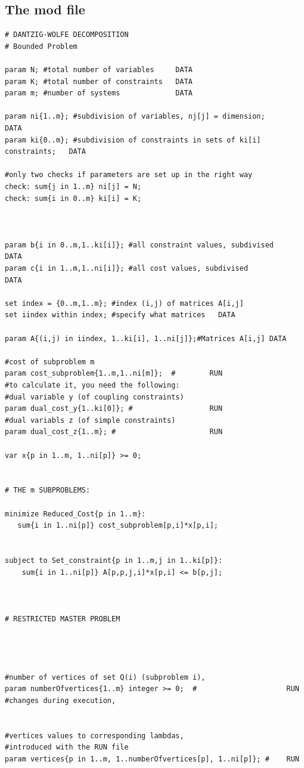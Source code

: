 \documentclass[a4paper,12pt]{article}
\begin{document}
\subsection{The mod file}
\begin{lstlisting}
# DANTZIG-WOLFE DECOMPOSITION
# Bounded Problem

param N; #total number of variables     DATA
param K; #total number of constraints   DATA
param m; #number of systems             DATA 

param ni{1..m}; #subdivision of variables, nj[j] = dimension;               DATA
param ki{0..m}; #subdivision of constraints in sets of ki[i] constraints;   DATA

#only two checks if parameters are set up in the right way
check: sum{j in 1..m} ni[j] = N;
check: sum{i in 0..m} ki[i] = K; 



param b{i in 0..m,1..ki[i]}; #all constraint values, subdivised          DATA
param c{i in 1..m,1..ni[i]}; #all cost values, subdivised                DATA

set index = {0..m,1..m}; #index (i,j) of matrices A[i,j] 
set iindex within index; #specify what matrices   DATA

param A{(i,j) in iindex, 1..ki[i], 1..ni[j]};#Matrices A[i,j] DATA

#cost of subproblem m
param cost_subproblem{1..m,1..ni[m]};  #        RUN
#to calculate it, you need the following:
#dual variable y (of coupling constraints)
param dual_cost_y{1..ki[0]}; #                  RUN
#dual variabls z (of simple constraints)
param dual_cost_z{1..m}; #                      RUN

var x{p in 1..m, 1..ni[p]} >= 0;   


# THE m SUBPROBLEMS:

minimize Reduced_Cost{p in 1..m}:
   sum{i in 1..ni[p]} cost_subproblem[p,i]*x[p,i];


subject to Set_constraint{p in 1..m,j in 1..ki[p]}:
	sum{i in 1..ni[p]} A[p,p,j,i]*x[p,i] <= b[p,j];



# RESTRICTED MASTER PROBLEM 




#number of vertices of set Q(i) (subproblem i), 
param numberOfvertices{1..m} integer >= 0;  #                     RUN
#changes during execution, 


#vertices values to corresponding lambdas, 
#introduced with the RUN file
param vertices{p in 1..m, 1..numberOfvertices[p], 1..ni[p]}; #    RUN


\end{lstlisting}
\end{document}
